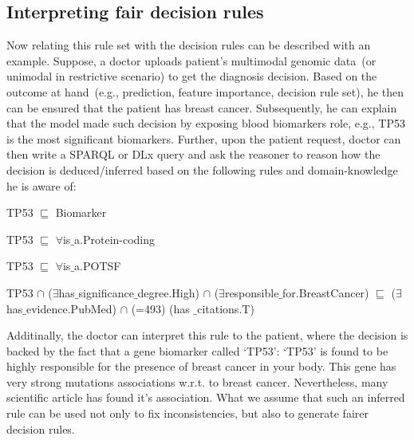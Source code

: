 \subsection{Interpreting fair decision rules}

Now relating this rule set with the decision rules can be described with an example. Suppose, a doctor uploads patient's multimodal genomic data~(or unimodal in restrictive scenario) to get the diagnosis decision. Based on the outcome at hand~(e.g., prediction, feature importance, decision rule set), he then can be ensured that the patient has breast cancer. Subsequently, he can explain that the model made such decision by exposing blood biomarkers role, e.g., TP53 is the most significant biomarkers. Further, upon the patient request, doctor can then write a SPARQL or DLx query and ask the reasoner to reason how the decision is deduced/inferred based on the following rules and domain-knowledge he is aware of:  

\begin{itemize}[noitemsep]
\scriptsize{
    \item TP53 $ \sqsubseteq  $ Biomarker
    \item TP53 $ \sqsubseteq  $ $  \forall $is$ {\_}$a.Protein-coding
    \item TP53 $ \sqsubseteq  $ $  \forall $is$ {\_}$a.POTSF
    \item TP53 $  \cap $ ($\exists$has$ {\_}$significance$ {\_}$degree.High) $  \cap $ ($\exists$responsible$ {\_}$for.BreastCancer) $ \sqsubseteq  $ ($\exists$has$ {\_}$evidence.PubMed) $\cap$ (=493) (has ${\_}$citations.T)}
\end{itemize}

\hspace*{3.5mm} Additinally, the doctor can interpret this rule to the patient, where the decision is backed by the fact that a gene biomarker called `TP53': `TP53' is found to be highly responsible for the presence of breast cancer in your body. This gene has very strong mutations associations w.r.t. to breast cancer. Nevertheless, many scientific article has found it's association. What we assume that such an inferred rule can be used not only to fix inconsistencies, but also to generate fairer decision rules.

